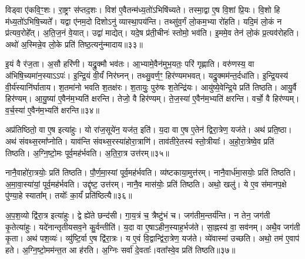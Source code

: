 विड्वा ए॑कवि॒ꣳ॒शः।
रा॒ष्ट्रꣳ स॑प्तद॒शः।
विश॑ ए॒वैतन्म॑ध्य॒तो॑\-ऽभिषि॑च्यते।
तस्मा॒द्वा ए॒ष वि॒शां प्रि॒यः।
वि॒शो हि म॑ध्य॒तो॑\-ऽभिषि॒च्यते᳚।
यद्वा ए॑नम॒दो दिशोऽनु॑ व्यास्था॒पय॑न्ति।
तथ्सु॑व॒र्गं लो॒कम॒भ्या रो॑हति।
यदि॒मं लो॒कं न प्र॑त्यव॒रोहे᳚त्।
अ॒ति॒ज॒नं वे॒यात्।
उद्वा॑ माद्येत्।
यदे॒ष प्र॑ती॒चीनः॑ स्तोमो॒ भव॑ति।
इ॒ममे॒व तेन॑ लो॒कं प्र॒त्यव॑रोहति।
अथो॑ अ॒स्मिन्ने॒व लो॒के प्रति॑ तिष्ठ॒त्यनु॑न्मादाय॥३३॥\ip\anuvakamend[अक्र॑न्राज॒न्यो॑ भव॑न्ति दश॒पेयो॑ माद्ये॒त्त्रीणि॑ च]

इ॒यं वै र॑ज॒ता।
अ॒सौ हरि॑णी।
यद्रु॒क्मौ भव॑तः।
आ॒भ्यामे॒वैन॑मुभ॒यतः॒ परि॑ गृह्णाति।
वरु॑णस्य॒ वा अ॑भिषि॒च्यमा॑न॒स्या\-ऽऽपः॑।
इ॒न्द्रि॒यं वी॒र्यं॑ निर॑घ्नन्।
तथ्सु॒वर्ण॒ꣳ॒ हिर॑ण्यमभवत्।
यद्रु॒क्मम॑न्त॒र्द\-धा॑ति।
इ॒न्द्रि॒यस्य॑ वी॒र्य॑स्या\-नि॑र्घाताय।
श॒तमा॑नो भवति श॒तक्ष॑रः।
श॒तायुः॒ पुरु॑षः श॒तेन्द्रि॑यः।
आयु॑ष्ये॒वेन्द्रि॒ये प्रति॑ तिष्ठति।
आयु॒र्वै हिर॑ण्यम्।
आ॒यु॒ष्या॑ ए॒वैन॑म॒भ्यति॑ क्षरन्ति।
तेजो॒ वै हिर॑ण्यम्।
ते॒ज॒स्या॑ ए॒वैन॑म॒भ्यति॑ क्षरन्ति।
वर्चो॒ वै हिर॑ण्यम्।
व॒र्च॒स्या॑ ए॒वैन॑म॒भ्यति॑ क्षरन्ति॥३४॥\ip\anuvakamend[श॒तक्ष॑रो॒\-ऽष्टौ च॑]

अप्र॑तिष्ठितो॒ वा ए॒ष इत्या॑हुः।
यो रा॑ज॒सूये॑न॒ यज॑त॒ इति॑।
य॒दा वा ए॒ष ए॒तेन॑ द्विरा॒त्रेण॒ यज॑ते।
अथ॑ प्रति॒ष्ठा।
अथ॑ संवथ्स॒रमा᳚प्नोति।
याव॑न्ति संवथ्स॒रस्या॑होरा॒त्राणि॑।
ताव॑तीरे॒तस्य॑ स्तो॒त्रीयाः᳚।
अ॒हो॒रा॒त्रेष्वे॒व प्रति॑ तिष्ठति।
अ॒ग्नि॒ष्टो॒मः पूर्व॒मह॑र्भवति।
अ॒ति॒रा॒त्र उत्त॑रम्॥३५॥\ip

नानै॒वाहो॑रा॒त्रयोः॒ प्रति॑ तिष्ठति।
पौ॒र्ण॒मा॒स्यां पूर्व॒मह॑र्भवति।
व्य॑ष्टकाया॒मुत्त॑रम्।
नानै॒वार्ध॑मा॒सयोः॒ प्रति॑ तिष्ठति।
अ॒मा॒वा॒स्या॑यां॒ पूर्व॒मह॑र्भवति।
उद्दृ॑ष्ट॒ उत्त॑रम्।
नानै॒व मास॑योः॒ प्रति॑ तिष्ठति।
अथो॒ खलु॑।
ये ए॒व स॑मानप॒क्षे पु॑ण्या॒हे स्याता᳚म्।
तयोः᳚ का॒र्यं॑ प्रति॑\-ष्ठित्यै॥३६॥\ip

अ॒प॒श॒व्यो द्वि॑रा॒त्र इत्या॑हुः।
द्वे ह्ये॑ते छन्द॑सी।
गा॒य॒त्रं च॒ त्रैष्टु॑भं च।
जग॑तीम॒न्तर्य॑न्ति।
न तेन॒ जग॑ती कृ॒तेत्या॑हुः।
यदे॑नान्तृतीयसव॒ने कु॒र्वन्तीति॑।
य॒दा वा ए॒षा\-ऽहीन॒स्याह॒र्भज॑ते।
सा॒ह्नस्य॑ वा॒ सव॑नम्।
अथै॒व जग॑ती कृ॒ता।
अथ॑ पश॒व्यः॑।
व्यु॑ष्टि॒र्वा ए॒ष द्वि॑रा॒त्रः।
य ए॒वं वि॒द्वान्द्वि॑रा॒त्रेण॒ यज॑ते।
व्ये॑वास्मा॑ उच्छति।
अथो॒ तम॑ ए॒वाप॑ हते।
अ॒ग्नि॒ष्टो॒मम॑न्त॒त आ ह॑रति।
अ॒ग्निः सर्वा॑ दे॒वताः᳚।वता᳚स्वे॒व प्रति॑ तिष्ठति॥३७॥\ip\anuvakamend[उत्त॑रं॒ प्रति॑\-ष्ठित्यै पश॒व्यः॑ स॒प्त च॑]


\clearpage

